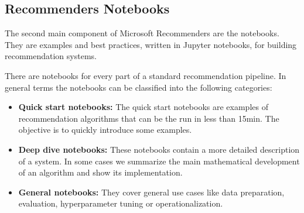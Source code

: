\subsection{Recommenders Notebooks}

The second main component of Microsoft Recommenders are the notebooks. They are examples and best practices, 
written in Jupyter notebooks, for building recommendation systems.

There are notebooks for every part of a standard recommendation pipeline. In general terms the notebooks can be 
classified into the following categories:
\begin{itemize}
    \item \textbf{Quick start notebooks:} The quick start notebooks are examples of recommendation algorithms that 
    can be the run in less than 15min. The objective is to quickly introduce some examples.
    \item \textbf{Deep dive notebooks:} These notebooks contain a more detailed description of a system. In some cases
    we summarize the main mathematical development of an algorithm and show its implementation.
    \item \textbf{General notebooks:} They cover general use cases like data preparation, evaluation, hyperparameter
    tuning or operationalization.
\end{itemize}

